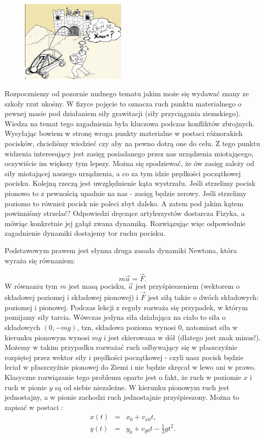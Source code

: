 \documentclass[10pt,twocolumn]{article}
\begin{document}
\begin{figure}
     \includegraphics[width=5cm]{1a.png}
\end{figure}
Rozpoczniemy od pozornie nudnego tematu jakim może się wydawać znany
ze szkoły rzut ukośny. W fizyce pojęcie to oznacza ruch punktu
materialnego o pewnej masie pod działaniem siły grawitacji (siły
przyciągania ziemskiego). Wiedza na temat tego zagadnienia była
kluczowa podczas konfliktów zbrojnych. Wysyłając bowiem w stronę wroga
punkty materialne w postaci różnorakich pocisków, chcieliśmy wiedzieć
czy aby na pewno dotrą one do celu. Z tego punktu widzenia
interesujący jest zasięg posiadanego przez nas urządzenia miotającego,
oczywiście im większy tym lepszy. Można się spodziewać, że ów zasięg
zależy od siły miotającej naszego urządzenia, a co za tym idzie
prędkości początkowej pocisku. Kolejną rzeczą jest uwzględnienie kąta
wystrzału. Jeśli strzelimy pocisk pionowo to z pewnością upadnie na
nas - zasięg będzie zerowy. Jeśli strzelimy poziomo to również pocisk
nie poleci zbyt daleko. A zatem pod jakim kątem powinniśmy strzelać?
Odpowiedzi dręczące artylerzystów dostarcza Fizyka, a mówiąc
konkretnie jej gałąź zwana dynamiką. Rozwiązując więc odpowiednie
zagadnienie dynamiki dostajemy tor ruchu pocisku.

Podstawowym prawem jest słynna druga zasada dynamiki Newtona, która
wyraża się równaniem:

\begin{equation}
\label{eq:Ni}
m \vec  a = \vec F.
\end{equation}
%
W równaniu tym $m$ jest masą pocisku, $\vec a$ jest przyśpieszeniem
(wektorem o składowej poziomej i składowej pionowej) i $\vec F$ jest
siłą także o dwóch składowych: poziomej i pionowej.  Podczas lekcji z
reguły rozważa się przypadek, w którym pomijamy siły tarcia. Wówczas
jedyna siła działająca na ciało to siła o składowych $(0,-mg)$, tzn,
składowa pozioma wynosi 0, natomiast siła w kierunku pionowym wynosi
$mg$ i jest skierowana w dół (dlatego jest znak minus!). Możemy w
takim przypadku rozważać ruch odbywający się w płaszczyźnie rozpiętej
przez wektor siły i prędkości początkowej - czyli nasz pocisk będzie
leciał w płaszczyźnie pionowej do Ziemi i nie będzie skręcał w lewo
ani w prawo. Klasyczne rozwiązanie tego problemu oparte jest o fakt,
że ruch w poziomie $x$ i ruch w pionie $y$ są od siebie niezależne. W
kierunku pionowym ruch jest jednostajny, a w pionie zachodzi ruch
jednostajnie przyśpieszony. Można to zapisać w postaci
\cite{wikirzut}:
%
\begin{eqnarray}
\label{eq:param}
x(t) &=& x_0+v_{x0} t, \nonumber \\
y(t) &=& y_0 + v_{y0} t - \frac{1}{2}g t^2.
\end{eqnarray}
\end{document}
